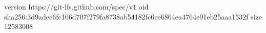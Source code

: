 version https://git-lfs.github.com/spec/v1
oid sha256:3d9adee6fc106d707f279fa8738ab54182fc6ee6864ea4764e91eb25aaa1532f
size 12583008
